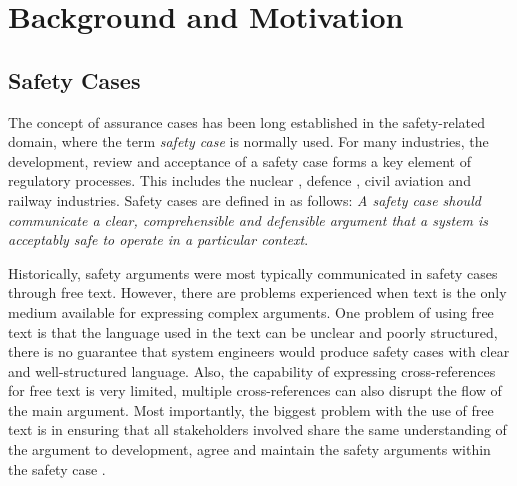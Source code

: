 \section{Background and Motivation}
\label{sec:background}

\subsection{Safety Cases}
The concept of assurance cases has been long established in the safety-related domain, where the term \textit{safety case} is normally used. 
For many industries, the development, review and acceptance of a safety case forms a key element of regulatory processes. This includes the nuclear \cite{hse}, defence \cite{mod2007}, civil aviation \cite{caa2007} and railway \cite{yellowBook2007} industries. Safety cases are defined in \cite{kelly2004goal} as follows: \textit{A safety case should communicate a clear, comprehensible and defensible argument that a system is acceptably safe to operate in a particular context}. 

Historically, safety arguments were most typically communicated in safety cases through free text. However, there are problems experienced when text is the only medium available for expressing complex arguments. One problem of using free text is that the language used in the text can be unclear and poorly structured, there is no guarantee that system engineers would produce safety cases with clear and well-structured language. Also, the capability of expressing cross-references for free text is very limited, multiple cross-references can also disrupt the flow of the main argument. Most importantly, the biggest problem with the use of free text is in ensuring that all stakeholders involved share the same understanding of the argument to development, agree and maintain the safety arguments within the safety case \cite{kelly2004goal}.

